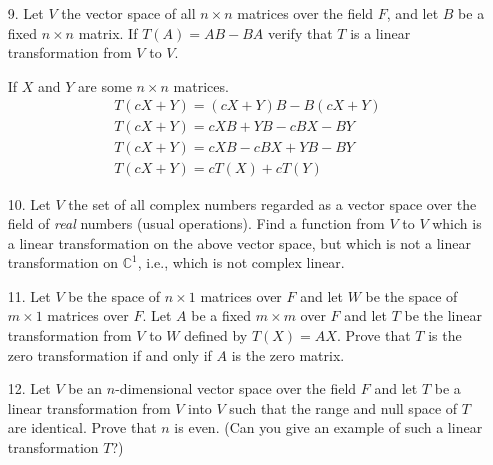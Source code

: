 \documentclass{article}
\begin{document}
\begin{enumerate}[listparindent=\parindent]
\item[9.] Let \(V\) the vector space of all \(n \times n\) matrices over the field \(F\), and let \(B\) be a fixed \(n \times n\) matrix.
    If \(T(A) = AB - BA\) verify that \(T\) is a linear transformation from \(V\) to \(V\).

    If \(X\) and \(Y\) are some \(n \times n\) matrices.
    \begin{gather*}
        T(cX + Y) = (cX + Y)B - B(cX + Y) \\
        T(cX + Y) = cXB + YB - cBX - BY \\
        T(cX + Y) = cXB - cBX + YB - BY \\
        T(cX + Y) = cT(X) + cT(Y)
    \end{gather*}

\item[10.] Let \(V\) the set of all complex numbers regarded as a vector space over the field of \textit{real} numbers (usual operations).
    Find a function from \(V\) to \(V\) which is a linear transformation on the above vector space, but which is not a linear transformation on \(\mathbb{C}^1\),
    i.e., which is not complex linear.

\item[11.] Let \(V\) be the space of \(n \times 1\) matrices over \(F\) and let \(W\) be the space of \(m \times 1 \) matrices over \(F\).
    Let \(A\) be a fixed \(m \times m\) over \(F\) and let \(T\) be the linear transformation from \(V\) to \(W\) defined by \(T(X) = AX\).
    Prove that \(T\) is the zero transformation if and only if \(A\) is the zero matrix.

\item[12.] Let \(V\) be an \(n\)-dimensional vector space over the field \(F\) and let \(T\) be a linear transformation from \(V\) into \(V\)
    such that the range and null space of \(T\) are identical. Prove that \(n\) is even. (Can you give an example of such a linear transformation \(T\)?)

\end{enumerate}
\end{document}
